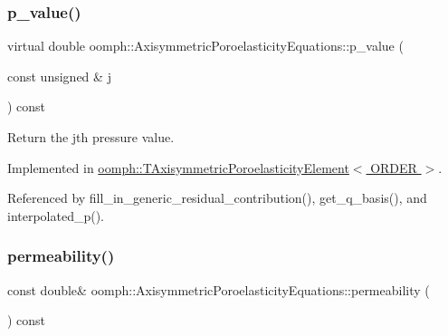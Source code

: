 \mbox{\label{classoomph_1_1AxisymmetricPoroelasticityEquations_aab0aa10f1a243bff20e540a3744c1c5b}} 
\subsubsection{\texorpdfstring{p\+\_\+value()}{p\_value()}}
{\footnotesize\ttfamily virtual double oomph\+::\+Axisymmetric\+Poroelasticity\+Equations\+::p\+\_\+value (\begin{DoxyParamCaption}\item[{const unsigned \&}]{j }\end{DoxyParamCaption}) const\hspace{0.3cm}{\ttfamily [pure virtual]}}



Return the jth pressure value. 



Implemented in \hyperlink{classoomph_1_1TAxisymmetricPoroelasticityElement_a4fd508fc048ef38ab6cd288d58a84d13}{oomph\+::\+T\+Axisymmetric\+Poroelasticity\+Element$<$ O\+R\+D\+E\+R $>$}.



Referenced by fill\+\_\+in\+\_\+generic\+\_\+residual\+\_\+contribution(), get\+\_\+q\+\_\+basis(), and interpolated\+\_\+p().

\mbox{\label{classoomph_1_1AxisymmetricPoroelasticityEquations_ab52dc140cfce886743c584c2bae82548}} 
\subsubsection{\texorpdfstring{permeability()}{permeability()}}
{\footnotesize\ttfamily const double\& oomph\+::\+Axisymmetric\+Poroelasticity\+Equations\+::permeability (\begin{DoxyParamCaption}{ }\end{DoxyParamCaption}) const\hspace{0.3cm}{\ttfamily [inline]}}



